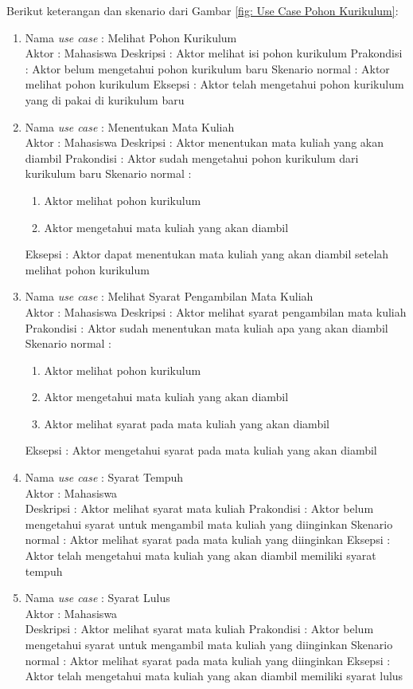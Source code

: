 Berikut keterangan dan skenario dari Gambar \ref{fig: Use Case Pohon Kurikulum}:
\begin{enumerate}
\item Nama \textit{use case} : Melihat Pohon Kurikulum \\
	  Aktor : Mahasiswa 
	  Deskripsi :  Aktor melihat isi pohon kurikulum 
	  Prakondisi : Aktor belum mengetahui pohon kurikulum baru 
	  Skenario normal : Aktor melihat pohon kurikulum
	  Eksepsi : Aktor telah mengetahui pohon kurikulum yang di pakai di kurikulum baru
	  
\item Nama \textit{use case} : Menentukan Mata Kuliah \\
	  Aktor : Mahasiswa 
	  Deskripsi :  Aktor menentukan mata kuliah yang akan diambil 
	  Prakondisi : Aktor sudah mengetahui pohon kurikulum dari kurikulum baru
	  Skenario normal :
	  \begin{enumerate}
	  \item Aktor melihat pohon kurikulum
	  \item Aktor mengetahui mata kuliah yang akan diambil
	  \end{enumerate}
	  Eksepsi : Aktor dapat menentukan mata kuliah yang akan diambil setelah melihat pohon kurikulum
	  
\item Nama \textit{use case} : Melihat Syarat Pengambilan Mata Kuliah \\
	  Aktor : Mahasiswa 
	  Deskripsi :  Aktor melihat syarat pengambilan mata kuliah
	  Prakondisi : Aktor sudah menentukan mata kuliah apa yang akan diambil
	  Skenario normal : 
	  \begin{enumerate}
	  \item Aktor melihat pohon kurikulum
	  \item Aktor mengetahui mata kuliah yang akan diambil
	  \item Aktor melihat syarat pada mata kuliah yang akan diambil
	  \end{enumerate}
	  Eksepsi : Aktor mengetahui syarat pada mata kuliah yang akan diambil
	  
\item Nama \textit{use case} : Syarat Tempuh \\
	  Aktor : Mahasiswa \\
	  Deskripsi :  Aktor melihat syarat mata kuliah
	  Prakondisi : Aktor belum mengetahui syarat untuk mengambil mata kuliah yang diinginkan
	  Skenario normal : Aktor melihat syarat pada mata kuliah yang diinginkan
	  Eksepsi : Aktor telah mengetahui mata kuliah yang akan diambil memiliki syarat tempuh
	 
\item Nama \textit{use case} : Syarat Lulus \\
	  Aktor : Mahasiswa \\
	  Deskripsi :  Aktor melihat syarat mata kuliah
	  Prakondisi : Aktor belum mengetahui syarat untuk mengambil mata kuliah yang diinginkan
	  Skenario normal : Aktor melihat syarat pada mata kuliah yang diinginkan
	  Eksepsi : Aktor telah mengetahui mata kuliah yang akan diambil memiliki syarat lulus
\end{enumerate}


